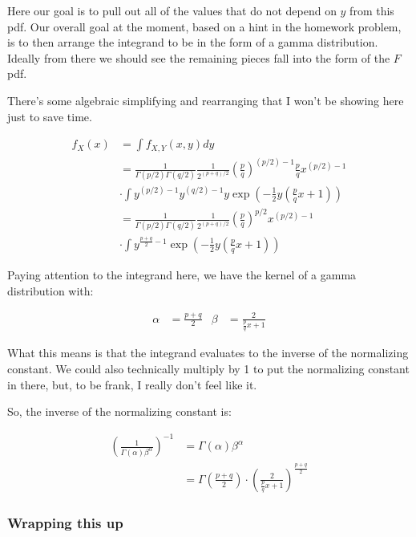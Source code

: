 Here our goal is to pull out all of the values that do not depend on $y$ from this pdf. Our overall goal at the moment, based on a hint in the homework problem, is to then arrange the integrand to be in the form of a gamma distribution. Ideally from there we should see the remaining pieces fall into the form of the $F$ pdf.

There's some algebraic simplifying and rearranging that I won't be showing here just to save time. 

\begin{align*}
	f_X(x) &= \int f_{X,Y}(x,y) dy \\
	&= \frac{1}{\Gamma(p/2)\Gamma(q/2)} 
	\frac{1}{2^{(p+q)/2}} 
	\left( \frac{p}{q} \right)^{(p/2)-1} 
	\frac{p}{q}
	x^{(p/2)-1} \\
	&\cdot \int y^{(p/2)-1} y^{(q/2)-1} y \exp\left( -\frac{1}{2}y \left( \frac{p}{q}x + 1 \right) \right) \\
	&= \frac{1}{\Gamma(p/2)\Gamma(q/2)} 
	\frac{1}{2^{(p+q)/2}} 
	\left( \frac{p}{q} \right)^{p/2} 
	x^{(p/2)-1} \\
	&\cdot \int y^{\frac{p+q}{2} - 1} \exp\left( -\frac{1}{2}y \left( \frac{p}{q}x + 1 \right) \right)
\end{align*}

Paying attention to the integrand here, we have the kernel of a gamma distribution with:\vspace{-2mm}

\begin{align*}
	\alpha &= \frac{p+q}{2} & \beta &= \frac{2}{\frac{p}{q}x + 1}
\end{align*}

What this means is that the integrand evaluates to the inverse of the normalizing constant. We could also technically multiply by 1 to put the normalizing constant in there, but, to be frank, I really don't feel like it.

So, the inverse of the normalizing constant is:

\begin{align*}
	\left( \frac{1}{\Gamma(\alpha)\beta^{\alpha}} \right)^{-1} &= \Gamma(\alpha)\beta^{\alpha} \\
	&= \Gamma\left( \frac{p+q}{2} \right) \cdot \left( \frac{2}{\frac{p}{q}x + 1} \right)^{\frac{p+q}{2}}
\end{align*}

\pagebreak
\subsubsection*{Wrapping this up}

